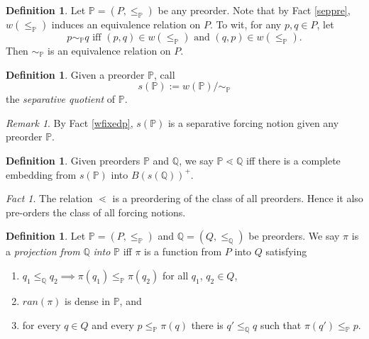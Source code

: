 \documentclass[12pt, twoside]{memoir}
\numberwithin{equation}{section}
\theoremstyle{definition}
\newtheorem{defi}[thm]{Definition}
\theoremstyle{remark}
\newtheorem{rem}[thm]{Remark}
\newtheorem{fact}[thm]{Fact}
\theoremstyle{definition}
\theoremstyle{definition}
\theoremstyle{definition}
\theoremstyle{remark}
\begin{document}
\begin{defi}
Let $\mathbb{P} = (P, \leq_{\mathbb{P}})$ be any preorder. Note that by Fact \ref{seppre}, $w(\leq_{\mathbb{P}})$ induces an equivalence relation on $P$. To wit, for any $p, q \in P$, let $$p \sim_{\mathbb{P}} q \text{ iff } (p, q) \in w(\leq_{\mathbb{P}}) \text{ and } (q, p) \in w(\leq_{\mathbb{P}}) \text{.}$$ Then $\sim_{\mathbb{P}}$ is an equivalence relation on $P$.
\end{defi} 

\begin{defi}
Given a preorder $\mathbb{P}$, call $$s(\mathbb{P}) := w(\mathbb{P}) / \sim_{\mathbb{P}}$$ the \emph{separative quotient} of $\mathbb{P}$.
\end{defi}

\begin{rem}
By Fact \ref{wfixedp}, $s(\mathbb{P})$ is a separative forcing notion given any preorder $\mathbb{P}$.
\end{rem}

\begin{defi}
Given preorders $\mathbb{P}$ and $\mathbb{Q}$, we say $\mathbb{P} \lessdot \mathbb{Q}$ iff there is a complete embedding from $s(\mathbb{P})$ into $B(s(\mathbb{Q}))^+$.
\end{defi}

\begin{fact}\label{forpre}
The relation $\lessdot$ is a preordering of the class of all preorders. Hence it also pre-orders the class of all forcing notions.
\end{fact}

\begin{defi}\label{def3218}
Let $\mathbb{P} = (P, \leq_{\mathbb{P}})$ and $\mathbb{Q} = (Q, \leq_{\mathbb{Q}})$ be preorders. We say $\pi$ is a \emph{projection from} $\mathbb{Q}$ \emph{into} $\mathbb{P}$ iff $\pi$ is a function from $P$ into $Q$ satisfying
\begin{enumerate}[label=(\alph*)]
    \item\label{3218a} $q_1 \leq_{\mathbb{Q}} q_2 \implies \pi(q_1) \leq_{\mathbb{P}} \pi(q_2)$ for all $q_1$, $q_2 \in Q$, 
    \item\label{3218b} $ran(\pi)$ is dense in $\mathbb{P}$, and
    \item\label{3218c} for every $q \in Q$ and every $p \leq_{\mathbb{P}} \pi(q)$ there is $q' \leq_{\mathbb{Q}} q$ such that $\pi(q') \leq_{\mathbb{P}} p$.
\end{enumerate}
\end{defi}
\end{document}

